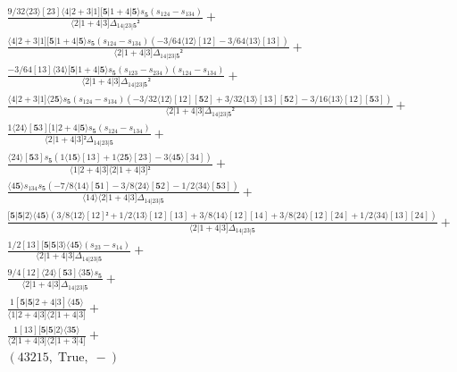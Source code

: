 \documentclass[varwidth, border=5pt]{standalone}
\begin{document}
\begin{my}
$\begin{gathered}
\scriptscriptstyle\frac{9/32⟨23⟩[23]⟨4|2+3|1][𝟓|1+4|𝟓⟩s_{𝟓}(s_{124}-s_{134})}{⟨2|1+4|3]Δ_{14|23|𝟓}²} +\\
\scriptscriptstyle\frac{⟨4|2+3|1][𝟓|1+4|𝟓⟩s_{𝟓}(s_{124}-s_{134})(-3/64⟨12⟩[12]-3/64⟨13⟩[13])}{⟨2|1+4|3]Δ_{14|23|𝟓}²} +\\
\scriptscriptstyle\frac{-3/64[13]⟨34⟩[𝟓|1+4|𝟓⟩s_{𝟓}(s_{123}-s_{234})(s_{124}-s_{134})}{⟨2|1+4|3]Δ_{14|23|𝟓}²} +\\
\scriptscriptstyle\frac{⟨4|2+3|1]⟨2𝟓⟩s_{𝟓}(s_{124}-s_{134})(-3/32⟨12⟩[12][𝟓2]+3/32⟨13⟩[13][𝟓2]-3/16⟨13⟩[12][𝟓3])}{⟨2|1+4|3]Δ_{14|23|𝟓}²} +\\
\scriptscriptstyle\frac{1⟨24⟩[𝟓3][1|2+4|𝟓⟩s_{𝟓}(s_{124}-s_{134})}{⟨2|1+4|3]²Δ_{14|23|𝟓}} +\\
\scriptscriptstyle\frac{⟨24⟩[𝟓3]s_{𝟓}(1⟨1𝟓⟩[13]+1⟨2𝟓⟩[23]-3⟨4𝟓⟩[34])}{⟨1|2+4|3]⟨2|1+4|3]²} +\\
\scriptscriptstyle\frac{⟨4𝟓⟩s_{134}s_{𝟓}(-7/8⟨14⟩[𝟓1]-3/8⟨24⟩[𝟓2]-1/2⟨34⟩[𝟓3])}{⟨14⟩⟨2|1+4|3]Δ_{14|23|𝟓}} +\\
\scriptscriptstyle\frac{[𝟓|𝟓|2⟩⟨4𝟓⟩(3/8⟨12⟩[12]²+1/2⟨13⟩[12][13]+3/8⟨14⟩[12][14]+3/8⟨24⟩[12][24]+1/2⟨34⟩[13][24])}{⟨2|1+4|3]Δ_{14|23|𝟓}} +\\
\scriptscriptstyle\frac{1/2[13][𝟓|𝟓|3⟩⟨4𝟓⟩(s_{23}-s_{14})}{⟨2|1+4|3]Δ_{14|23|𝟓}} +\\
\scriptscriptstyle\frac{9/4[12]⟨24⟩[𝟓3]⟨3𝟓⟩s_{𝟓}}{⟨2|1+4|3]Δ_{14|23|𝟓}} +\\
\scriptscriptstyle\frac{1[𝟓|𝟓|2+4|3]⟨4𝟓⟩}{⟨1|2+4|3]⟨2|1+4|3]} +\\
\scriptscriptstyle\frac{1[13][𝟓|𝟓|2⟩⟨3𝟓⟩}{⟨2|1+4|3]⟨2|1+3|4]} +\\
\scriptscriptstyle(43215,\;\text{True},\;-) \phantom{+}
\end{gathered}$
\end{my}
\end{document}
